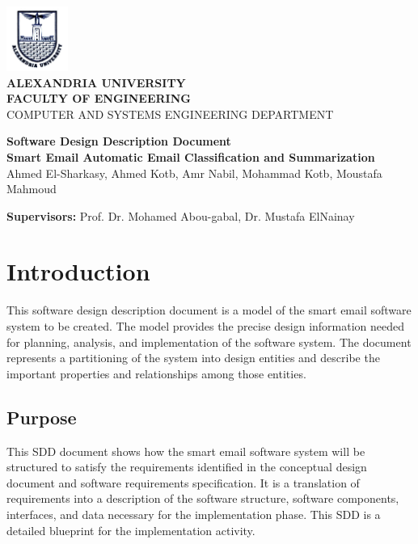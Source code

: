 \documentclass[12pt]{article}
\begin{document}
\begin{titlepage}
\vspace{-1.5cm}
\begin{center}
\includegraphics[width=2cm]{Logo_Alexandria_University.jpg}\\
\vspace{1cm}
\textbf{\large ALEXANDRIA UNIVERSITY} \\
\textbf{FACULTY OF ENGINEERING} \\
{\small  COMPUTER AND SYSTEMS ENGINEERING DEPARTMENT}

\vspace{2.5cm}
\textbf{\LARGE Software Design Description Document}\\
\textbf{\small Smart Email Automatic Email Classification and Summarization}\\
\vspace{1cm}
{ Ahmed El-Sharkasy, Ahmed Kotb, Amr Nabil, Mohammad Kotb, Moustafa Mahmoud }
\end{center}

\vspace{1ex}
\textbf{Supervisors:} Prof. Dr. Mohamed Abou-gabal, Dr. Mustafa ElNainay
\end{titlepage}

\newpage
\tableofcontents
\newpage

\section{Introduction}

This software design description document is a model of the smart email software system to be created. The model provides the precise design information needed for planning, analysis, and implementation of the software system. The document represents a partitioning of the system into design entities and describe the important properties and relationships among those entities.

\subsection{Purpose}
This SDD document shows how the smart email software system will be structured to satisfy the requirements identiﬁed in the conceptual design document and software requirements speciﬁcation. It is a translation of requirements into a description of the software
structure, software components, interfaces, and data necessary for the implementation phase. This SDD is a detailed blueprint for the implementation activity.
\end{document}
